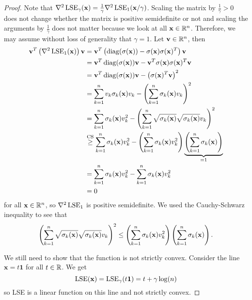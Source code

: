 \begin{proof}
 Note that \(\nabla^2 \operatorname{LSE}_\gamma(\mathbf{x}) = \frac{1}{\gamma} \nabla^2 \operatorname{LSE}_1 (\mathbf{x}/\gamma)\).
 Scaling the matrix by \(\frac{1}{\gamma} > 0\) does not change whether the matrix is positive semidefinite or not 
 and scaling the arguments by \(\frac{1}{\gamma}\) does not matter because we look at all \(\mathbf{x} \in \mathbb{R}^n\).
 Therefore, we may assume without loss of generality that \(\gamma = 1\). 
 Let \(\mathbf{v} \in \mathbb{R}^n\), then
 \begin{align*}
  \mathbf{v}^T \left({\nabla^2 \operatorname{LSE}_1(\mathbf{x})}\right) \mathbf{v} & = \mathbf{v}^T \left({ \operatorname{diag}(\sigma(\mathbf{x})) - \sigma(\mathbf{x}) \sigma(\mathbf{x})^T }\right) \mathbf{v} \\
                                                               & = \mathbf{v}^T \operatorname{diag}(\sigma(\mathbf{x})) \mathbf{v} - \mathbf{v}^T \sigma(\mathbf{x}) \sigma(\mathbf{x})^T \mathbf{v} \\
                                                               & = \mathbf{v}^T \operatorname{diag}(\sigma(\mathbf{x})) \mathbf{v} - \left({ \sigma(\mathbf{x})^T \mathbf{v} }\right)^2 \\
                                                               & = \sum_{k = 1}^n v_k \sigma_k(\mathbf{x}) v_k - \left({ \sum_{k = 1}^n \sigma_k(\mathbf{x}) v_k }\right)^2 \\
                                                               & = \sum_{k = 1}^n \sigma_k(\mathbf{x}) v_k^2 - \left({ \sum_{k = 1}^n \sqrt{\sigma_k(\mathbf{x})} \sqrt{\sigma_k(\mathbf{x})} v_k }\right)^2 \\
                                                               & \stackrel{\text{CS}}{\geq} \sum_{k = 1}^n \sigma_k(\mathbf{x}) v_k^2 - \left({ \sum_{k = 1}^n \sigma_k(\mathbf{x}) v_k^2 }\right) \underbrace{\left({ \sum_{k = 1}^n \sigma_k(\mathbf{x}) }\right)}_{=1} \\
                                                               & = \sum_{k = 1}^n \sigma_k(\mathbf{x}) v_k^2 - \sum_{k = 1}^n \sigma_k(\mathbf{x}) v_k^2 \\
                                                               & = 0
 \end{align*}
 for all \(\mathbf{x} \in \mathbb{R}^n\), so \(\nabla^2 \operatorname{LSE}_1\) is positive semidefinite. We used the Cauchy-Schwarz inequality to see that 
 \[ \left({ \sum_{k = 1}^n \sqrt{\sigma_k(\mathbf{x})} \sqrt{\sigma_k(\mathbf{x})} v_k }\right)^2 \leq \left({ \sum_{k = 1}^n \sigma_k(\mathbf{x}) v_k^2 }\right) \left({ \sum_{k = 1}^n \sigma_k(\mathbf{x}) }\right). \] 
 
 We still need to show that the function is not strictly convex. 
 Consider the line \(\mathbf{x} = t \mathbf{1}\) for all \(t \in \mathbb{R}\). We get
 \[ \operatorname{LSE}(\mathbf{x}) = \operatorname{LSE}_\gamma(t \mathbf{1}) = t + \gamma \log(n) \]
 so LSE is a linear function on this line and not strictly convex.
\end{proof}


